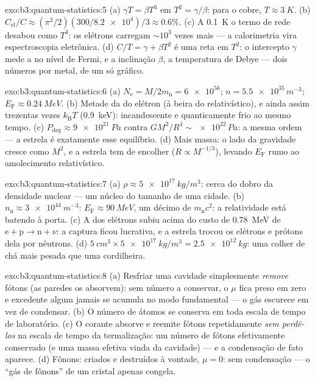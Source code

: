 \begin{solution}{exo:b3:quantum-statistics:5}
(a) $\gamma T = \beta T^3$ em $T^2 = \gamma/\beta$: para o cobre,
$T \approx \qty{3}{K}$. (b) $C_{\text{el}}/C \approx
(\pi^2/2)(300/\num{8.2e4})/3 \approx 0.6\%$. (c) A \qty{0.1}{K}
o termo de rede desabou como $T^3$: os elétrons carregam
$\sim10^3$ vezes mais --- a calorimetria vira espectroscopia
eletrônica. (d) $C/T = \gamma + \beta T^2$ é uma reta em
$T^2$: o intercepto $\gamma$ mede a  no
nível de Fermi, e a inclinação $\beta$, a temperatura de Debye --- dois
números por metal, de um só gráfico.
\end{solution}

\begin{solution}{exo:b3:quantum-statistics:6}
(a) $N_{\text{e}} = M/2m_{\text{n}} = \num{6e56}$; $n =
\num{5.5e35}\,\unit{m^{-3}}$; $E_{\text{F}} \approx
\qty{0.24}{MeV}$. (b) Metade da  do elétron (à beira
do relativístico), e ainda assim trezentas vezes $k_{\text{B}}T$
(\qty{0.9}{keV}): incandescente e quanticamente frio ao mesmo tempo. (c)
$P_{\text{deg}} \approx \qty{9e21}{Pa}$ contra $GM^2/R^4 \sim
\num{e22}\,\unit{Pa}$: a mesma ordem --- a estrela é exatamente esse
equilíbrio. (d) Mais massa: o lado da gravidade cresce como $M^2$, e a
estrela tem de encolher ($R \propto M^{-1/3}$), levando $E_{\text{F}}$
rumo ao amolecimento relativístico.
\end{solution}

\begin{solution}{exo:b3:quantum-statistics:7}
(a) $\rho \approx \qty{5e17}{kg/m^3}$: cerca do dobro da densidade
nuclear --- um núcleo do tamanho de uma cidade. (b) $n_{\text{n}}
\approx \qty{3e44}{m^{-3}}$: $E_{\text{F}} \approx \qty{90}{MeV}$,
um décimo de $m_{\text{n}}c^2$: a relatividade está batendo à porta. (c) A
 dos elétrons subiu acima do custo de \qty{0.78}{MeV} de
$\text{e} + \text{p} \to \text{n} + \nu$: a captura ficou
lucrativa, e a estrela trocou os elétrons e prótons dela por
nêutrons. (d) $\qty{5}{cm^3} \times \qty{5e17}{kg/m^3} =
\qty{2.5e12}{kg}$: uma colher de chá mais pesada que uma cordilheira.
\end{solution}

\begin{solution}{exo:b3:quantum-statistics:8}
(a) Resfriar uma cavidade simplesmente \emph{remove} fótons (as paredes
os absorvem): sem número a conservar, o $\mu$ fica preso em zero e
excedente algum jamais se acumula no modo fundamental --- o gás
escurece em vez de condensar. (b) O número de átomos se conserva em
toda escala de tempo de laboratório. (c) O corante absorve e reemite
fótons repetidamente \emph{sem perdê-los} na escala de tempo da
termalização: um número de fótons efetivamente conservado (e uma massa
efetiva vinda da cavidade) --- e a condensação de fato aparece.
(d) Fônons: criados e destruídos à vontade, $\mu = 0$: sem
condensação --- o ``gás de fônons'' de um cristal apenas congela.
\end{solution}

